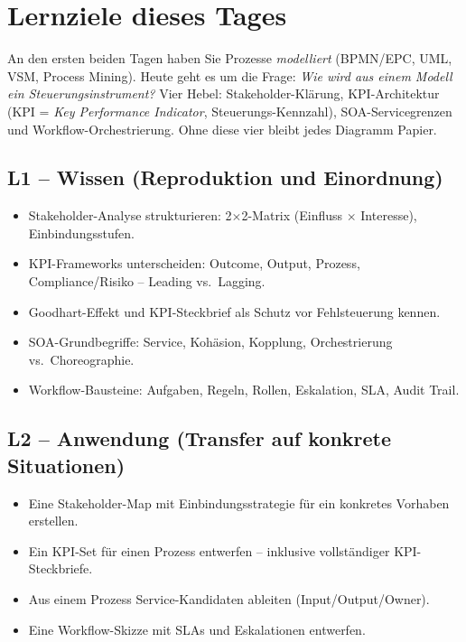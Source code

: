 \documentclass[11pt,a4paper,oneside]{article}
\begin{document}
\section*{Lernziele dieses Tages}
\thispagestyle{plain}

\noindent An den ersten beiden Tagen haben Sie Prozesse \emph{modelliert} (BPMN/EPC, UML, VSM, Process Mining). Heute geht es um die Frage: \emph{Wie wird aus einem Modell ein Steuerungsinstrument?} Vier Hebel: Stakeholder-Klärung, KPI-Architektur (KPI = \emph{Key Performance Indicator}, Steuerungs-Kennzahl), SOA-Servicegrenzen und Workflow-Orchestrierung. Ohne diese vier bleibt jedes Diagramm Papier.

\subsection*{L1 -- Wissen (Reproduktion und Einordnung)}
\begin{itemize}
  \item Stakeholder-Analyse strukturieren: 2$\times$2-Matrix (Einfluss $\times$ Interesse), Einbindungsstufen.
  \item KPI-Frameworks unterscheiden: Outcome, Output, Prozess, Compliance/Risiko -- Leading vs.\ Lagging.
  \item Goodhart-Effekt und KPI-Steckbrief als Schutz vor Fehlsteuerung kennen.
  \item SOA-Grundbegriffe: Service, Kohäsion, Kopplung, Orchestrierung vs.\ Choreographie.
  \item Workflow-Bausteine: Aufgaben, Regeln, Rollen, Eskalation, SLA, Audit Trail.
\end{itemize}

\subsection*{L2 -- Anwendung (Transfer auf konkrete Situationen)}
\begin{itemize}
  \item Eine Stakeholder-Map mit Einbindungsstrategie für ein konkretes Vorhaben erstellen.
  \item Ein KPI-Set für einen Prozess entwerfen -- inklusive vollständiger KPI-Steckbriefe.
  \item Aus einem Prozess Service-Kandidaten ableiten (Input/Output/Owner).
  \item Eine Workflow-Skizze mit SLAs und Eskalationen entwerfen.
\end{itemize}
\end{document}
